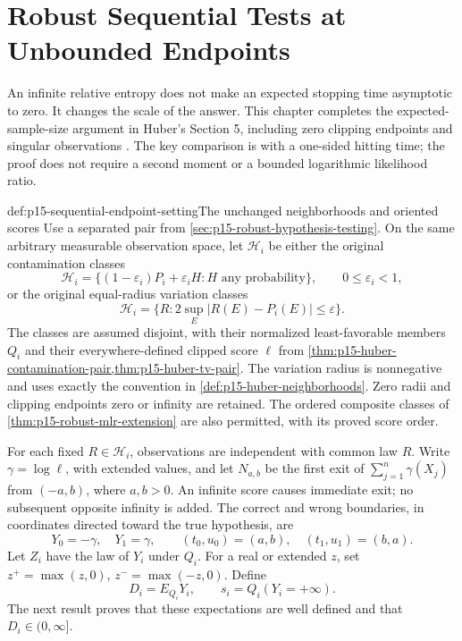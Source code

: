 \chapter{Robust Sequential Tests at Unbounded Endpoints}
\label{sec:p15-robust-sequential-endpoints}

An infinite relative entropy does not make an expected stopping time
asymptotic to zero. It changes the scale of the answer. This chapter
completes the expected-sample-size argument in Huber's Section 5,
including zero clipping endpoints and singular observations
\cite[p.~1757]{Huber1965RobustProbabilityRatio}.
The key comparison is with a one-sided hitting time; the proof does
not require a second moment or a bounded logarithmic likelihood ratio.

\begin{hbdefinition}{def:p15-sequential-endpoint-setting}{The unchanged neighborhoods and oriented scores}
Use a separated pair from \cref{sec:p15-robust-hypothesis-testing}.
On the same arbitrary measurable observation space, let
\(\mathcal H_i\) be either the original contamination classes
\[
 \mathcal H_i=\{(1-\varepsilon_i)P_i+\varepsilon_iH:
                    H\text{ any probability}\},\qquad 0\leq\varepsilon_i<1,
\]
or the original equal-radius variation classes
\[
 \mathcal H_i=\{R:2\sup_E|R(E)-P_i(E)|\leq\varepsilon\}.
\]
The classes are assumed disjoint, with their normalized least-favorable
members \(Q_i\) and their everywhere-defined clipped score \(\ell\)
from \cref{thm:p15-huber-contamination-pair,thm:p15-huber-tv-pair}.
The variation radius is nonnegative and uses exactly the convention
in \cref{def:p15-huber-neighborhoods}.
Zero radii and clipping endpoints zero or infinity are retained.
The ordered composite classes of \cref{thm:p15-robust-mlr-extension}
are also permitted, with its proved score order.

For each fixed \(R\in\mathcal H_i\), observations are independent
with common law \(R\). Write \(\gamma=\log\ell\), with extended values,
and let \(N_{a,b}\) be the first exit of \(\sum_{j=1}^n\gamma(X_j)\)
from \((-a,b)\), where \(a,b>0\). An infinite score causes immediate
exit; no subsequent opposite infinity is added.
The correct and wrong boundaries, in coordinates directed toward the
true hypothesis, are
\[
 Y_0=-\gamma,\quad Y_1=\gamma,\qquad
 (t_0,u_0)=(a,b),\quad(t_1,u_1)=(b,a).
\]
Let \(Z_i\) have the law of \(Y_i\) under \(Q_i\).
For a real or extended \(z\), set \(z^+=\max(z,0)\),
\(z^-=\max(-z,0)\). Define
\[
 D_i=E_{Q_i}Y_i,\qquad s_i=Q_i(Y_i=+\infty).
\]
The next result proves that these expectations are well defined and
that \(D_i\in(0,\infty]\).
\end{hbdefinition}

